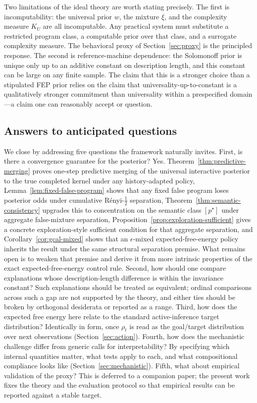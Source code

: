 \documentclass[11pt]{article}
\theoremstyle{remark}
\begin{document}
Two limitations of the ideal theory are worth stating precisely. The first is incomputability: the universal prior \(w\), the mixture \(\xi\), and the complexity measure \(K_U\) are all incomputable. Any practical system must substitute a restricted program class, a computable prior over that class, and a surrogate complexity measure. The behavioral proxy of Section~\ref{sec:proxy} is the principled response. The second is reference-machine dependence: the Solomonoff prior is unique only up to an additive constant on description length, and this constant can be large on any finite sample. The claim that this is a stronger choice than a stipulated FEP prior relies on the claim that universality-up-to-constant is a qualitatively stronger commitment than universality within a prespecified domain---a claim one can reasonably accept or question.

\subsection{Answers to anticipated questions}

We close by addressing five questions the framework naturally invites. First, is there a convergence guarantee for the posterior? Yes. Theorem~\ref{thm:predictive-merging} proves one-step predictive merging of the universal interactive posterior to the true completed kernel under any history-adapted policy, Lemma~\ref{lem:fixed-false-program} shows that any fixed false program loses posterior odds under cumulative R\'enyi-\(\frac12\) separation, Theorem~\ref{thm:semantic-consistency} upgrades this to concentration on the semantic class \([p^\star]\) under aggregate false-mixture separation, Proposition~\ref{prop:exploration-sufficient} gives a concrete exploration-style sufficient condition for that aggregate separation, and Corollary~\ref{cor:gcal-mixed} shows that an \(\epsilon\)-mixed expected-free-energy policy inherits the result under the same structural separation premise. What remains open is to weaken that premise and derive it from more intrinsic properties of the exact expected-free-energy control rule. Second, how should one compare explanations whose description-length difference is within the invariance constant? Such explanations should be treated as equivalent; ordinal comparisons across such a gap are not supported by the theory, and either ties should be broken by orthogonal desiderata or reported as a range. Third, how does the expected free energy here relate to the standard active-inference target distribution? Identically in form, once \(\rho_t\) is read as the goal/target distribution over next observations (Section~\ref{sec:action}). Fourth, how does the mechanistic challenge differ from generic calls for interpretability? By specifying which internal quantities matter, what tests apply to each, and what compositional compliance looks like (Section~\ref{sec:mechanistic}). Fifth, what about empirical validation of the proxy? This is deferred to a companion paper; the present work fixes the theory and the evaluation protocol so that empirical results can be reported against a stable target.
\end{document}
